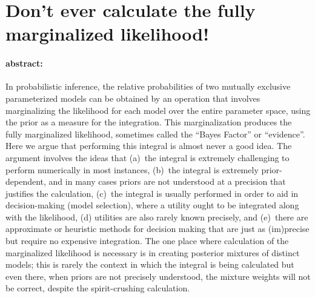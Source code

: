 \documentclass[12pt]{article}
\begin{document}
\section*{Don't ever calculate the fully marginalized likelihood!}

\paragraph{abstract:}
In probabilistic inference, the relative probabilities of two mutually
exclusive parameterized models can be obtained by an operation that
involves marginalizing the likelihood for each model over the entire
parameter space, using the prior as a measure for the integration.
This marginalization produces the fully marginalized likelihood,
sometimes called the ``Bayes Factor'' or ``evidence''.  Here we argue
that performing this integral is almost never a good idea.  The
argument involves the ideas that (a)~the integral is extremely
challenging to perform numerically in most instances, (b)~the integral
is extremely prior-dependent, and in many cases priors are not
understood at a precision that justifies the calculation, (c)~the
integral is usually performed in order to aid in decision-making
(model selection), where a utility ought to be integrated along with
the likelihood, (d) utilities are also rarely known precisely, and
(e)~there are approximate or heuristic methods for decision making
that are just as (im)precise but require no expensive integration.
The one place where calculation of the marginalized likelihood is
necessary is in creating posterior mixtures of distinct models; this
is rarely the context in which the integral is being calculated but
even there, when priors are not precisely understood, the mixture
weights will not be correct, despite the spirit-crushing calculation.
\end{document}
